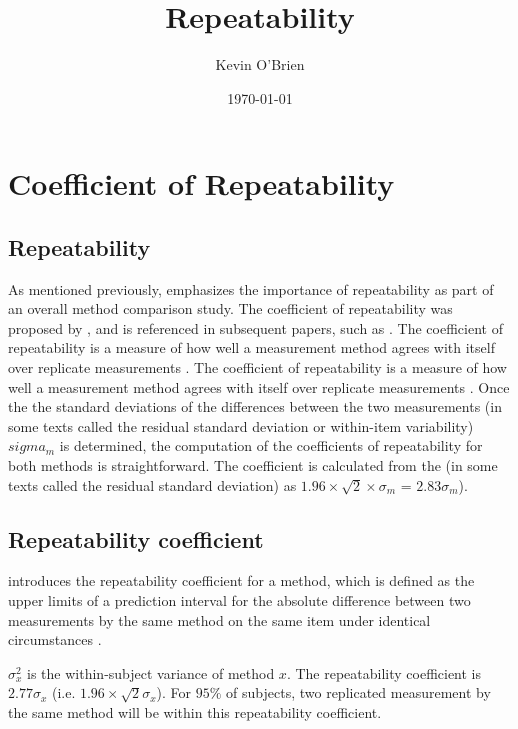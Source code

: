 \documentclass[12pt, a4paper]{article}
\begin{document}
	\author{Kevin O'Brien}
	\title{Repeatability}
	\date{\today}
	\maketitle
\tableofcontents
\newpage
	\newpage
	\section{Coefficient of Repeatability}
	\subsection{Repeatability}
	As mentioned previously, \citet{Barnhart} emphasizes the importance of repeatability as part of an overall method comparison study. The coefficient of repeatability was proposed by \citet{BA99}, and is referenced in subsequent papers, such as \citet{BXC2008}. The coefficient of repeatability is a measure of how well a
	measurement method agrees with itself over replicate measurements
	\citep{BA99}. The coefficient of repeatability is a measure of how well a
	measurement method agrees with itself over replicate measurements
	\citep{BA99}. Once the the standard deviations of the differences between the two measurements (in some texts called the residual standard deviation or within-item variability) $sigma_m$ is determined, the
	computation of the coefficients of repeatability for both methods
	is straightforward. The coefficient is calculated from the (in some texts called the residual standard deviation) as  $1.96 \times \sqrt{2} \times \sigma_m$ = $2.83 \sigma_m$).
	
	

	
	\subsection{Repeatability coefficient}
	\citet{BA99} introduces the repeatability coefficient for a method, which is defined as the upper limits of a prediction interval for the absolute difference between two measurements by the same
	method on the same item under identical circumstances \citep{BXC2008}.
	
	$\sigma^2_{x}$ is the within-subject variance of method $x$. The repeatability coefficient is $2.77 \sigma_{x}$ (i.e. $1.96 \times \sqrt{2} \sigma_{x}$). For $95\%$ of subjects, two replicated measurement by the same method will be within this repeatability coefficient.
	
\end{document}
